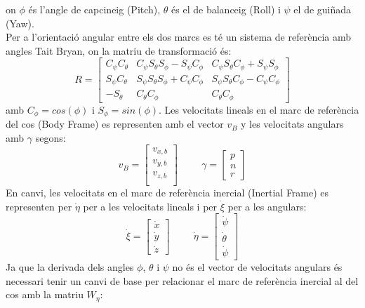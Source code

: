 \documentclass[twoside]{article}
\begin{document}
on $\phi$ és l'angle de capcineig (Pitch), $\theta$ és el de balanceig (Roll) i $\psi$ el de guiñada (Yaw).\\
Per a l'orientació angular entre els dos marcs es té un sistema de referència amb angles Tait Bryan, on la matriu de transformació és:
\begin{equation}
R=\left[\begin{array}{ccc}
C_\psi C_\theta & C_\psi S_\theta S_\phi - S_\psi C_\phi & C_\psi S_\theta C_\phi + S_\psi S_\phi \\
S_\psi C_\theta & S_\psi S_\theta S_\phi + C_\psi C_\phi & S_\psi S_\theta C_\phi - C_\psi C_\phi \\
-S_\theta & C_\theta C_\phi & C_\theta C_\phi 
\end{array}\right]
\end{equation}
amb $C_\phi=cos(\phi)$ i $S_\phi=sin(\phi)$.\newpage
Les velocitats lineals en el marc de referència del cos (Body Frame) es representen amb el vector $v_B$ y les velocitats angulars amb $\gamma$ segons:
\begin{equation}
v_B=\left[\begin{array}{c}
v_{x,b}\\
v_{y,b}\\
v_{z,b}\\
\end{array}\right] \hspace{1cm} \gamma=\left[\begin{array}{c}
p\\
n\\
r
\end{array} \right]
\end{equation}
En canvi, les velocitats en el marc de referència inercial (Inertial Frame)  es representen per $\dot{\eta}$ per a les velocitats lineals i per $\dot{\xi}$ per a les angulars: 
\begin{equation}
\dot{\xi}=\left[\begin{array}{c}
\dot{x} \\
\dot{y} \\
\dot{z}
\end{array} \right] \hspace{1cm} \dot{\eta}=\left[\begin{array}{c}
\dot{\psi} \\
\dot{\theta} \\
\dot{\psi}
\end{array} \right] 
\end{equation}
Ja que la derivada dels angles $\phi$, $\theta$ i $\psi$ no és el vector de velocitats angulars és necessari tenir un canvi de base per relacionar el marc de referència inercial al del cos amb la matriu $W_\eta$:
\end{document}
